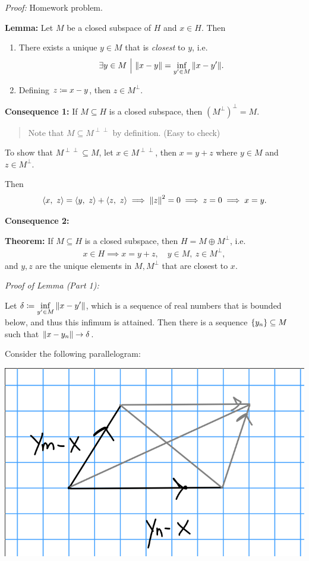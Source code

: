 \emph{Proof:} Homework problem.

\textbf{Lemma:} Let \(M\) be a closed subspace of \(H\) and \(x\in H\).
Then

\begin{enumerate}
\def\labelenumi{\arabic{enumi}.}
\item
  There exists a unique \(y \in M\) that is \emph{closest} to \(y\),
  i.e.~
  \begin{align*}
  \exists y\in M {~\mathrel{\Big|}~} {\left\lVert {x - y} \right\rVert} = \inf_{y' \in M}{\left\lVert {x - y'} \right\rVert}
  .\end{align*}
\item
  Defining \(z \coloneqq x-y\), then \(z\in M^\perp\).
\end{enumerate}

\textbf{Consequence 1:} If \(M \subseteq H\) is a closed subspace, then
\((M^\perp)^\perp = M\).

\begin{quote}
Note that \(M \subseteq M^{\perp \perp}\) by definition. (Easy to check)
\end{quote}

To show that \(M^{\perp \perp} \subseteq M\), let
\(x\in M^{\perp \perp}\), then \(x = y + z\) where \(y\in M\) and
\(z\in M^\perp\).

Then
\begin{align*}
{\left\langle {x},~{z} \right\rangle} = {\left\langle {y},~{z} \right\rangle} + {\left\langle {z},~{z} \right\rangle} \implies {\left\lVert {z} \right\rVert}^2 = 0 \implies z = 0 \implies x=y
.\end{align*}

\textbf{Consequence 2:}

\textbf{Theorem:} If \(M \subseteq H\) is a closed subspace, then
\(H = M \oplus M^\perp\), i.e.~
\begin{align*}
x\in H \implies x  = y + z, \quad y\in M, ~z\in M^\perp
,\end{align*} and \(y,z\) are the unique elements in \(M, M^\perp\) that
are closest to \(x\).

\emph{Proof of Lemma (Part 1):}

Let \(\delta \coloneqq \displaystyle\inf_{y' \in M} {\left\lVert {x - y'} \right\rVert}\),
which is a sequence of real numbers that is bounded below, and thus this
infimum is attained. Then there is a sequence
\(\left\{{y_n}\right\} \subseteq M\) such that \({\left\lVert {x - y_n} \right\rVert} \to \delta\).

Consider the following parallelogram:

\includegraphics{figures/2019-11-12-11:25.png}\\


